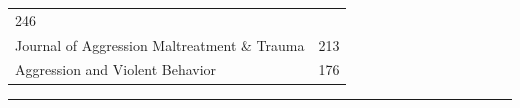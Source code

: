 \documentclass[]{tufte-handout}
\begin{document}
\begin{longtable}[]{@{}lr@{}}
\begin{minipage}[t]{0.09\columnwidth}
246\strut
\end{minipage}\tabularnewline
\begin{minipage}[t]{0.60\columnwidth}\raggedright\strut
Journal of Aggression Maltreatment \& Trauma\strut
\end{minipage} & \begin{minipage}[t]{0.09\columnwidth}\raggedleft\strut
213\strut
\end{minipage}\tabularnewline
\begin{minipage}[t]{0.60\columnwidth}\raggedright\strut
Aggression and Violent Behavior\strut
\end{minipage} & \begin{minipage}[t]{0.09\columnwidth}\raggedleft\strut
176\strut
\end{minipage}\tabularnewline
\bottomrule
\end{longtable}

\begin{center}\rule{0.5\linewidth}{\linethickness}\end{center}
\end{document}
